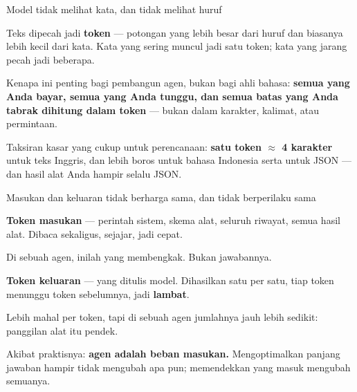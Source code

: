 \documentclass[aspectratio=169,11pt,t]{beamer}
\begin{document}
\begin{frame}[shrink=25]{Model tidak melihat kata, dan tidak melihat huruf}
{\fontsize{9.4}{12.6}\selectfont\color{fg2}Teks dipecah jadi \textbf{token} --- potongan yang lebih besar dari huruf dan biasanya lebih kecil dari kata. Kata yang sering muncul jadi satu token; kata yang jarang pecah jadi beberapa.\par}\vskip 4pt
{\fontsize{9.4}{12.6}\selectfont\color{fg2}Kenapa ini penting bagi pembangun agen, bukan bagi ahli bahasa: \textbf{semua yang Anda bayar, semua yang Anda tunggu, dan semua batas yang Anda tabrak dihitung dalam token} --- bukan dalam karakter, kalimat, atau permintaan.\par}\vskip 4pt
\begin{iband}[signal]
Taksiran kasar yang cukup untuk perencanaan: \textbf{satu token $\approx$ 4 karakter} untuk teks Inggris, dan lebih boros untuk bahasa Indonesia serta untuk JSON --- dan hasil alat Anda hampir selalu JSON.
\end{iband}
\end{frame}

\begin{frame}[shrink=25]{Masukan dan keluaran tidak berharga sama, dan tidak berperilaku sama}
\begin{minipage}[t]{0.485\textwidth}
{\fontsize{9.4}{12.6}\selectfont\color{fg2}\textbf{Token masukan} --- perintah sistem, skema alat, seluruh riwayat, semua hasil alat. Dibaca sekaligus, sejajar, jadi cepat.\par}\vskip 4pt
{\fontsize{9.4}{12.6}\selectfont\color{fg2}Di sebuah agen, inilah yang membengkak. Bukan jawabannya.\par}\vskip 4pt

\end{minipage}%
\hfill
\begin{minipage}[t]{0.485\textwidth}
{\fontsize{9.4}{12.6}\selectfont\color{fg2}\textbf{Token keluaran} --- yang ditulis model. Dihasilkan satu per satu, tiap token menunggu token sebelumnya, jadi \textbf{lambat}.\par}\vskip 4pt
{\fontsize{9.4}{12.6}\selectfont\color{fg2}Lebih mahal per token, tapi di sebuah agen jumlahnya jauh lebih sedikit: panggilan alat itu pendek.\par}\vskip 4pt

\end{minipage}%
{\fontsize{9.4}{12.6}\selectfont\color{fg2}Akibat praktisnya: \textbf{agen adalah beban masukan.} Mengoptimalkan panjang jawaban hampir tidak mengubah apa pun; memendekkan yang masuk mengubah semuanya.\par}\vskip 4pt
\end{frame}
\end{document}
